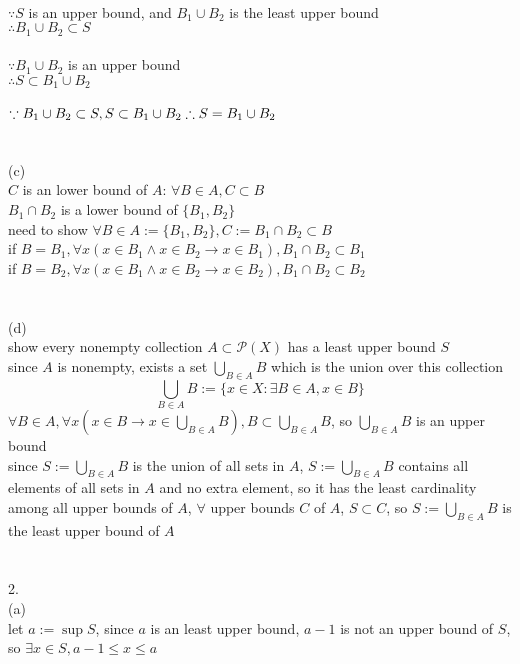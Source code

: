 \documentclass[12pt, border = 4pt, multi]{article} %
\begin{document}
\\
$\because S$ is an upper bound, and $B_1 \cup B_2$ is the least upper bound\\
$\therefore B_1 \cup B_2 \subset S$\\
\\
$\because B_1 \cup B_2$ is an upper bound\\
$\therefore S \subset B_1 \cup B_2$\\
\\
$\because B_1 \cup B_2 \subset S, S \subset B_1 \cup B_2\\
\therefore S = B_1 \cup B_2$\\
\\
\\
(c)\\
$C$ is an lower bound of $A$: $\forall B \in A, C \subset B$\\
$B_1 \cap B_2$ is a lower bound of $\{B_1, B_2\}$\\
need to show $\forall B \in A := \{B_1, B_2\}, C :=  B_1 \cap B_2 \subset B$\\
if $B = B_1, \forall x (x \in B_1 \wedge x \in B_2 \rightarrow x \in B_1), B_1 \cap B_2 \subset B_1$\\
if $B = B_2, \forall x (x \in B_1 \wedge x \in B_2 \rightarrow x \in B_2), B_1 \cap B_2 \subset B_2$\\
\\
\\
(d)\\
show every nonempty collection $A \subset \mathcal{P}(X)$ has a least upper bound $S$\\
since $A$ is nonempty, exists a set $\bigcup_{B \in A} B$ which is the union over this collection
\[\bigcup_{B \in A} B := \{x \in X: \exists B \in A, x \in B\}\]
$\forall B \in A, \forall x(x \in B \rightarrow x \in \bigcup_{B \in A} B), B \subset \bigcup_{B \in A} B$, so $\bigcup_{B \in A} B$ is an upper bound\\
since $S := \bigcup_{B \in A} B$ is the union of all sets in $A$, $S := \bigcup_{B \in A} B$ contains all elements of all sets in $A$ and no extra element, so it has the least cardinality among all upper bounds of $A$, $\forall$ upper bounds $C$ of $A$, $S \subset C$, so $S := \bigcup_{B \in A} B$ is the least upper bound of $A$\\
\\
\\
2.\\
(a)\\
let $a := \sup S$, since $a$ is an least upper bound, $a - 1$ is not an upper bound of $S$, so $\exists x \in S, a - 1 \leq x \leq a$\\
\end{document}
